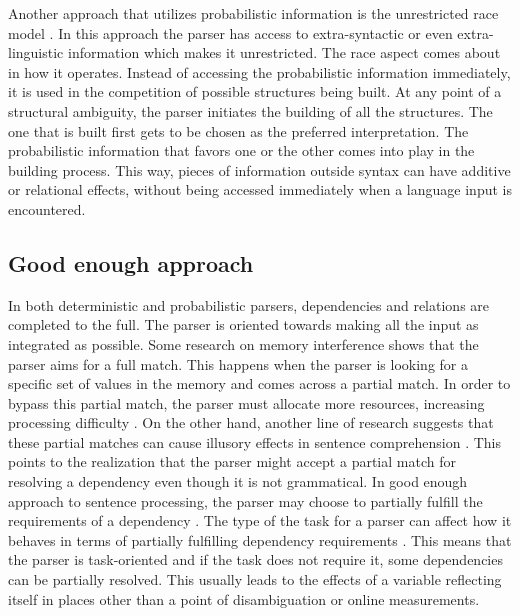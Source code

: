 Another approach that utilizes probabilistic information is the unrestricted race model \citep{van2005evidence,van2001reanalysis,traxler1998adjunct}. In this approach the parser has access to extra-syntactic or even extra-linguistic \citep{willits2015language} information which makes it unrestricted. The race aspect comes about in how it operates. Instead of accessing the probabilistic information immediately, it is used in the competition of possible structures being built. At any point of a structural ambiguity, the parser initiates the building of all the structures. The one that is built first gets to be chosen as the preferred interpretation. The probabilistic information that favors one or the other comes into play in the building process. This way, pieces of information outside syntax can have additive or relational effects, without being accessed immediately when a language input is encountered. 




\subsection{Good enough approach}

In both deterministic and probabilistic parsers, dependencies and relations are completed to the full. The parser is oriented towards making all the input as integrated as possible. Some research on memory interference shows that the parser aims for a full match. This happens when the parser is looking for a specific set of values in the memory and comes across a partial match. In order to bypass this partial match, the parser must allocate more resources, increasing processing difficulty \citep{van2012memory,VanDyke2006}. On the other hand, another line of research suggests that these partial matches can cause illusory effects in sentence comprehension \citep{Parker2016,mendia2018spurious,wagers2009agreement}. This points to the realization that the parser might accept a partial match for resolving a dependency even though it is not grammatical. In good enough approach to sentence processing, the parser may choose to partially fulfill the requirements of a dependency \citep{ferreira2001misinterpretations,ferreira2007good}. The type of the task for a parser can affect how it behaves in terms of partially fulfilling dependency requirements \citep{Swets2008,logavcev2016multiple}. This means that the parser is task-oriented and if the task does not require it, some dependencies can be partially resolved. This usually leads to the effects of a variable reflecting itself in places other than a point of disambiguation or online measurements.


